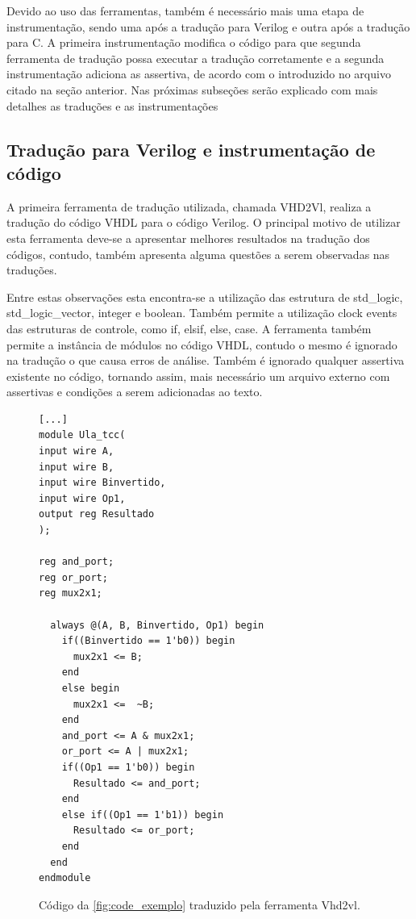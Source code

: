 \par
Devido ao uso das ferramentas, também é necessário mais uma etapa de instrumentação, sendo uma após a tradução para Verilog e outra após a tradução para C. A primeira instrumentação modifica o código para que segunda ferramenta de tradução possa executar a tradução corretamente e a segunda instrumentação adiciona as assertiva, de acordo com o introduzido no arquivo citado na seção anterior. Nas próximas subseções serão explicado com mais detalhes as traduções e as instrumentações

\subsection{Tradução para Verilog e instrumentação de código}

\par
A primeira ferramenta de tradução utilizada, chamada VHD2Vl\cite{vhd2vl}, realiza a tradução do código VHDL para o código Verilog. O principal motivo de utilizar esta ferramenta deve-se a apresentar melhores resultados na tradução dos códigos, contudo, também apresenta alguma questões a serem observadas nas traduções. 

\par
Entre estas observações esta encontra-se a utilização das estrutura de std\_logic, std\_logic\_vector, integer e boolean. Também permite a utilização clock events das estruturas de controle, como if, elsif, else, case. A ferramenta também permite a instância de módulos no código VHDL, contudo o mesmo é ignorado na tradução o que causa erros de análise. Também é ignorado qualquer assertiva existente no código, tornando assim, mais necessário um arquivo externo com assertivas e condições a serem adicionadas ao texto\cite{vhd2vl}.

\begin{figure}[H]
\caption{\label{fig:codigo_verilog} Código da \autoref{fig:code_exemplo} traduzido pela ferramenta Vhd2vl.}
	\begin{center}
    \begin{minipage}{0.7\textwidth}
    \begin{lstlisting}
[...]
module Ula_tcc(
input wire A,
input wire B,
input wire Binvertido,
input wire Op1,
output reg Resultado
);

reg and_port;
reg or_port;
reg mux2x1;

  always @(A, B, Binvertido, Op1) begin
    if((Binvertido == 1'b0)) begin
      mux2x1 <= B;
    end
    else begin
      mux2x1 <=  ~B;
    end
    and_port <= A & mux2x1;
    or_port <= A | mux2x1;
    if((Op1 == 1'b0)) begin
      Resultado <= and_port;
    end
    else if((Op1 == 1'b1)) begin
      Resultado <= or_port;
    end
  end
endmodule
    \end{lstlisting}
    \end{minipage}
	\end{center}
\end{figure}

